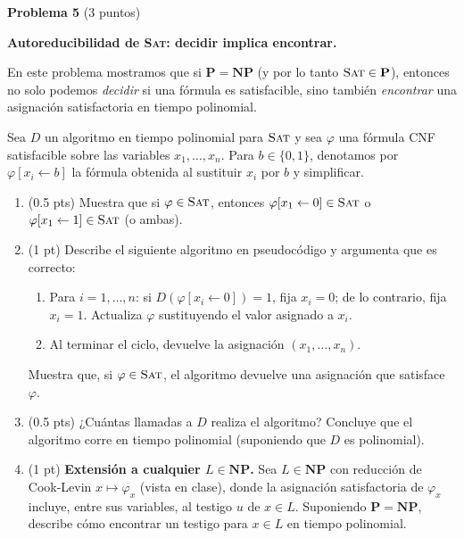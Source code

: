 \documentclass[12pt, letterpaper]{article}
\newcommand{\SAT}{\textsc{Sat}}
\newcommand{\NP}{\mathbf{NP}}
\newcommand{\PP}{\mathbf{P}}
\newcommand{\problema}[2]{%
  \bigskip
  \noindent\textbf{Problema #1} \textnormal{(#2 puntos)}\par\smallskip
}
\begin{document}
\problema{5}{3} \textbf{Autoreducibilidad de \SAT: decidir implica
encontrar.}

En este problema mostramos que si $\PP = \NP$ (y por lo tanto $\SAT \in \PP$),
entonces no solo podemos \emph{decidir} si una fórmula es satisfacible, sino
también \emph{encontrar} una asignación satisfactoria en tiempo polinomial.

Sea $D$ un algoritmo en tiempo polinomial para $\SAT$ y sea $\varphi$ una
fórmula CNF satisfacible sobre las variables $x_1, \ldots, x_n$.  Para
$b \in \{0,1\}$, denotamos por $\varphi[x_i \leftarrow b]$ la fórmula
obtenida al sustituir $x_i$ por $b$ y simplificar.

\begin{enumerate}[label=\alph*)]

\item (0.5 pts) Muestra que si $\varphi \in \SAT$, entonces
  $\varphi[x_1 \leftarrow 0] \in \SAT$ o
  $\varphi[x_1 \leftarrow 1] \in \SAT$ (o ambas).

\item (1 pt) Describe el siguiente algoritmo en pseudocódigo y argumenta
  que es correcto:
  \begin{enumerate}[label=\roman*.]
    \item Para $i = 1, \ldots, n$: si $D(\varphi[x_i \leftarrow 0]) = 1$,
      fija $x_i = 0$; de lo contrario, fija $x_i = 1$.  Actualiza $\varphi$
      sustituyendo el valor asignado a $x_i$.
    \item Al terminar el ciclo, devuelve la asignación $(x_1, \ldots, x_n)$.
  \end{enumerate}
  Muestra que, si $\varphi \in \SAT$, el algoritmo devuelve una asignación
  que satisface $\varphi$.

\item (0.5 pts) ¿Cuántas llamadas a $D$ realiza el algoritmo?
  Concluye que el algoritmo corre en tiempo polinomial (suponiendo que $D$
  es polinomial).

\item (1 pt) \textbf{Extensión a cualquier $L \in \NP$.}
  Sea $L \in \NP$ con reducción de Cook-Levin $x \mapsto \varphi_x$
  (vista en clase), donde la asignación satisfactoria de $\varphi_x$ incluye,
  entre sus variables, al testigo $u$ de $x \in L$.
  Suponiendo $\PP = \NP$, describe cómo encontrar un testigo para $x \in L$
  en tiempo polinomial.

\end{enumerate}
\end{document}
